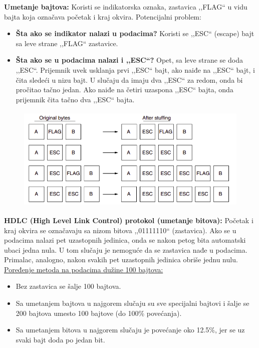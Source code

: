 \documentclass[a4paper]{article}
\begin{document}
    \textbf{Umetanje bajtova:} Koristi se indikatorska oznaka, zastavica ,,FLAG`` u vidu bajta koja označava početak
    i kraj okvira. Potencijalni problem:
    \begin{itemize}
        \item \textbf{Šta ako se indikator nalazi u podacima?} Koristi se ,,ESC`` (escape) bajt sa leve
              strane ,,FLAG`` zastavice.
        \item \textbf{Šta ako se u podacima nalazi i ,,ESC``?} Opet, sa leve strane se doda ,,ESC``. 
              Prijemnik uvek usklanja prvi ,,ESC`` bajt, ako naiđe na ,,ESC`` bajt, i čita sledeći u nizu bajt.
              U slučaju da imaju dva ,,ESC`` za redom, onda bi pročitao tačno jedan. Ako naiđe na
              četiri uzaspona ,,ESC`` bajta, onda prijemnik čita tačno dva ,,ESC`` bajta.
    \end{itemize}
    \begin{figure}[H]
        \begin{center}
            \includegraphics[width=120mm,height=50mm]{Slike/okvirivanje2.png}
        \end{center}
    \end{figure}
    \textbf{HDLC (High Level Link Control) protokol (umetanje bitova): } Početak i kraj okvira se 
    označavaju sa nizom bitova ,,01111110`` (zastavica). Ako se u podacima nalazi pet uzastopnih jedinica, 
    onda se nakon petog bita automatski ubaci jedna nula. U tom slučaju je nemoguće da se zastavica 
    nađe u podacima. Primalac, analogno, nakon svakih pet uzastopnih jedinica obriše jednu nulu.\\

    \noindent \underline{Poređenje metoda na podacima dužine 100 bajtova:}
    \begin{itemize}
        \item Bez zastavica se šalje 100 bajtova.
        \item Sa umetanjem bajtova u najgorem slučaju su sve specijalni bajtovi i šalje se 200 bajtova
              umesto 100 bajtove (do 100\% povećanja).
        \item Sa umetanjem bitova u najgorem slučaju je povećanje oko 12.5\%, jer se uz svaki bajt
              doda po jedan bit.
    \end{itemize} 
        
\end{document}
